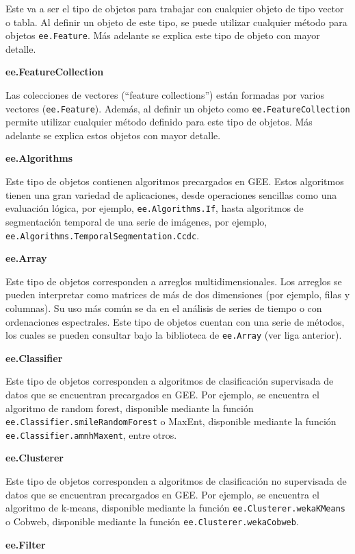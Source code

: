 \documentclass[
  12pt,
  letterpaper,
  twoside]{book}
\begin{document}
Este va a ser el tipo de objetos para trabajar con cualquier objeto de tipo vector o tabla. Al definir un objeto de este tipo, se puede utilizar cualquier método para objetos \texttt{ee.Feature}. Más adelante se explica este tipo de objeto con mayor detalle.

\textbf{ee.FeatureCollection}

Las colecciones de vectores (``feature collections'') están formadas por varios vectores (\texttt{ee.Feature}). Además, al definir un objeto como \texttt{ee.FeatureCollection} permite utilizar cualquier método definido para este tipo de objetos. Más adelante se explica estos objetos con mayor detalle.

\textbf{ee.Algorithms}

Este tipo de objetos contienen algoritmos precargados en GEE. Estos algoritmos tienen una gran variedad de aplicaciones, desde operaciones sencillas como una evaluación lógica, por ejemplo, \texttt{ee.Algorithms.If}, hasta algoritmos de segmentación temporal de una serie de imágenes, por ejemplo, \texttt{ee.Algorithms.TemporalSegmentation.Ccdc}.

\textbf{ee.Array}

Este tipo de objetos corresponden a arreglos multidimensionales. Los arreglos se pueden interpretar como matrices de más de dos dimensiones (por ejemplo, filas y columnas). Su uso más común se da en el análisis de series de tiempo o con ordenaciones espectrales. Este tipo de objetos cuentan con una serie de métodos, los cuales se pueden consultar bajo la biblioteca de \texttt{ee.Array} (ver liga anterior).

\textbf{ee.Classifier}

Este tipo de objetos corresponden a algoritmos de clasificación supervisada de datos que se encuentran precargados en GEE. Por ejemplo, se encuentra el algoritmo de random forest, disponible mediante la función \texttt{ee.Classifier.smileRandomForest} o MaxEnt, disponible mediante la función \texttt{ee.Classifier.amnhMaxent}, entre otros.

\textbf{ee.Clusterer}

Este tipo de objetos corresponden a algoritmos de clasificación no supervisada de datos que se encuentran precargados en GEE. Por ejemplo, se encuentra el algoritmo de k-means, disponible mediante la función \texttt{ee.Clusterer.wekaKMeans} o Cobweb, disponible mediante la función \texttt{ee.Clusterer.wekaCobweb}.

\textbf{ee.Filter}
\end{document}
